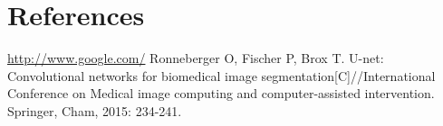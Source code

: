 \newpage
\section{References}
\begin{thebibliography}{99}
	\url{http://www.google.com/}
	Ronneberger O, Fischer P, Brox T. U-net: Convolutional networks for biomedical image segmentation[C]//International Conference on Medical image computing and computer-assisted intervention. Springer, Cham, 2015: 234-241.
\end{thebibliography}